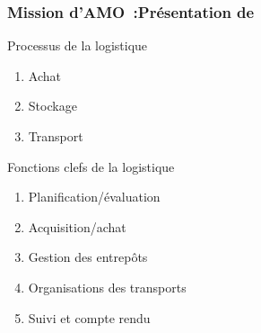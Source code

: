 \begin{frame}
\frametitle {Mission d'AMO~:Présentation de \mo} \pause
\begin{block}{Processus de la logistique} \pause
\begin{enumerate}
\item Achat \pause
\item Stockage \pause
\item Transport
\end{enumerate}
\end{block}

\begin{block}{Fonctions clefs de la logistique} \pause
\begin{enumerate}
\item Planification/évaluation \pause
\item Acquisition/achat \pause
\item Gestion des entrepôts \pause
\item Organisations des transports \pause
\item Suivi et compte rendu
\end{enumerate}
\end{block}

\end{frame}

